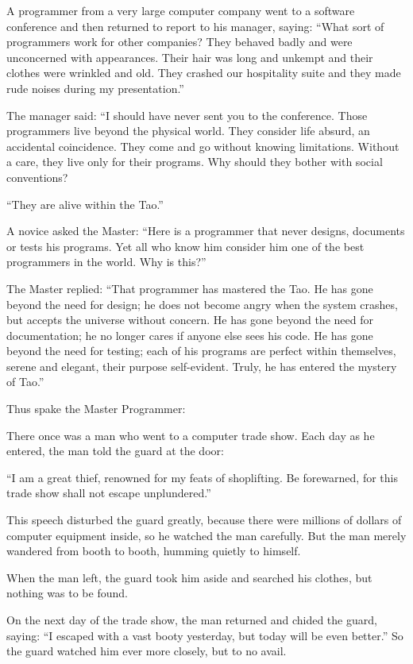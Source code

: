 A programmer from a very large computer company went to a software
conference and then returned to report to his manager, saying: ``What
sort of programmers work for other companies? They behaved badly and
were unconcerned with appearances. Their hair was long and unkempt and
their clothes were wrinkled and old. They crashed our hospitality
suite and they made rude noises during my presentation.''

The manager said: ``I should have never sent you to the
conference. Those programmers live beyond the physical world. They
consider life absurd, an accidental coincidence. They come and go
without knowing limitations. Without a care, they live only for their
programs. Why should they bother with social conventions?

``They are alive within the Tao.''

A novice asked the Master: ``Here is a programmer that never designs,
documents or tests his programs. Yet all who know him consider him one
of the best programmers in the world. Why is this?''

The Master replied: ``That programmer has mastered the Tao. He has
gone beyond the need for design; he does not become angry when the
system crashes, but accepts the universe without concern. He has gone
beyond the need for documentation; he no longer cares if anyone else
sees his code. He has gone beyond the need for testing; each of his
programs are perfect within themselves, serene and elegant, their
purpose self-evident. Truly, he has entered the mystery of Tao.''

Thus spake the Master Programmer:

There once was a man who went to a computer trade show. Each day as he
entered, the man told the guard at the door:

``I am a great thief, renowned for my feats of shoplifting. Be
forewarned, for this trade show shall not escape unplundered.''

This speech disturbed the guard greatly, because there were millions
of dollars of computer equipment inside, so he watched the man
carefully. But the man merely wandered from booth to booth, humming
quietly to himself.

When the man left, the guard took him aside and searched his clothes,
but nothing was to be found.

On the next day of the trade show, the man returned and chided the
guard, saying: ``I escaped with a vast booty yesterday, but today will
be even better.'' So the guard watched him ever more closely, but to
no avail.

